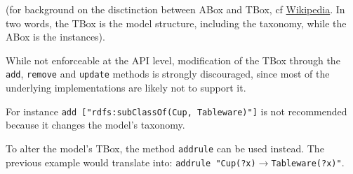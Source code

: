 (for background on the disctinction between ABox and TBox, cf \href{http://en.wikipedia.org/wiki/Description_logic\#Modeling}{ Wikipedia}. In two words, the TBox is the model structure, including the taxonomy, while the ABox is the instances).

While not enforceable at the API level, modification of the TBox through the \texttt{add}, \texttt{remove} and \texttt{update} methods is strongly discouraged, since most of the underlying implementations are likely not to support it.

For instance \texttt{add ["rdfs:subClassOf(Cup, Tableware)"]} is not recommended because it changes the model's taxonomy.

To alter the model's TBox, the method \texttt{addrule} can be used instead. The previous example would translate into: \texttt{addrule "Cup(?x){$\rightarrow$}Tableware(?x)"}.



